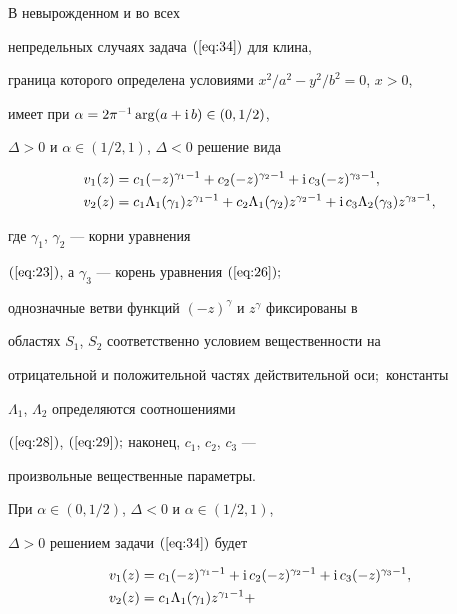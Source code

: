 \begin{thm}


В невырожденном и во всех


непредельных случаях задача $(\ref{eq:34})$ для клина,


граница которого определена условиями $x^2/a^2-y^2/b^2=0$, $x>0$,


имеет при $\alpha=2\pi^{-1}\arg(a+\mathrm i\, b)\in (0,1/2)$,


$\Delta>0$ и $\alpha\in (1/2,1)$, $\Delta<0$ решение вида


\begin{align*}


v_1(z)&=c_1(-z)^{\gamma_1-1}+c_2(-z)^{\gamma_2-1}+


\i c_3(-z)^{\gamma_3-1},\\


v_2(z)&=c_1\Lambda_1(\gamma_1)z^{\gamma_1-1}+


c_2\Lambda_1(\gamma_2)z^{\gamma_2-1}+


\i c_3\Lambda_2(\gamma_3) z^{\gamma_3-1},


\end{align*}


где $\gamma_1$, $\gamma_2$ --- корни уравнения


$(\ref{eq:23})$, а $\gamma_3$ --- корень уравнения $(\ref{eq:26});$


однозначные ветви функций $(-z)^\gamma$ и $z^\gamma$ фиксированы в


областях $S_1$, $S_2$ соответственно условием вещественности на


отрицательной и положительной частях действительной оси$;$ константы


$\Lambda_1$, $\Lambda_2$ определяются соотношениями


$(\ref{eq:28})$, $(\ref{eq:29});$ наконец, $c_1$, $c_2$, $c_3$ ---


произвольные вещественные параметры.





При $\alpha\in (0,1/2)$, $\Delta<0$ и $\alpha\in (1/2,1)$,


$\Delta>0$ решением задачи $(\ref{eq:34})$ будет


\begin{align*}


v_1(z)&=c_1(-z)^{\gamma_1-1}+\i c_2(-z)^{\gamma_2-1}+


\i c_3 (-z)^{\gamma_3-1},\\


v_2(z)&=c_1\Lambda_1(\gamma_1)z^{\gamma_1-1}+



\end{align*}
\end{thm}
